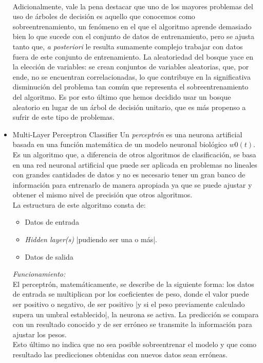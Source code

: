 \documentclass[spanish,12pt,letterpaper]{article}
\begin{document}
\begin{itemize}
    \\
    Adicionalmente, vale la pena destacar que uno de los mayores problemas del uso de árboles de decisión es aquello que conocemos como sobreentrenamiento, un fenómeno en el que el algoritmo aprende demasiado bien lo que sucede con el conjunto de datos de entrenamiento, pero se ajusta tanto que, \textit{a posteriori} le resulta sumamente complejo trabajar con datos fuera de este conjunto de entrenamiento. La aleatoriedad del bosque yace en la elección de variables: se crean conjuntos de variables aleatorias, que, por ende, no se encuentran correlacionadas, lo que contribuye en la significativa disminución del problema tan común que representa el sobreentrenamiento del algoritmo. Es por esto último que hemos decidido usar un bosque aleatorio en lugar de un árbol de decisión unitario, que es más propenso a sufrir de este tipo de problemas.

    \item Multi-Layer Perceptron Classifier
    Un \textit{perceptrón} es una neurona artificial basada en una función matemática de un modelo neuronal biológico $w0(t)$. 
    Es un algoritmo que, a diferencia de otros algoritmos de clasificación, se basa en una red neuronal artificial que puede ser aplicada en problemas no lineales con grandes cantidades de datos y no es necesario tener un gran banco de información para entrenarlo de manera apropiada ya que se puede ajustar y obtener el mismo nivel de precisión que otros algoritmos.\\
    La estructura de este algoritmo consta de:\\
    \begin{itemize}
        \item Datos de entrada
        \item \textit{Hidden layer(s)} |pudiendo ser una o más|.
        \item Datos de salida
    \end{itemize}
    \textit{Funcionamiento:}\\
    El perceptrón, matemáticamente, se describe de la siguiente forma: los datos de entrada se multiplican por los coeficientes de peso, donde el valor puede ser positivo o negativo, de ser positivo |y si el peso previamente calculado supera un umbral establecido|,  la neurona se activa. La predicción se compara con un resultado conocido y de ser erróneo se transmite la información para ajustar los pesos.\\ 
    Esto último no indica que no sea posible sobreentrenar el modelo y que como resultado las predicciones obtenidas con nuevos datos sean erróneas. 
    
    
\end{itemize}
\end{document}
